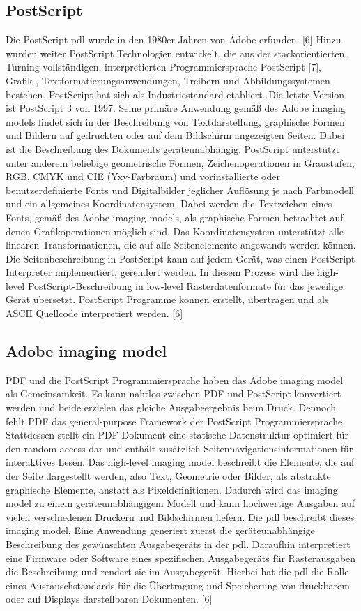 \subsection{PostScript}
Die PostScript \gls{pdl} wurde in den 1980er Jahren von Adobe erfunden. [6] Hinzu wurden weiter PostScript Technologien entwickelt, die aus der stackorientierten, Turning-vollständigen, interpretierten Programmiersprache PostScript [7], Grafik-, Textformatierungsanwendungen, Treibern und Abbildungssystemen bestehen. PostScript hat sich als Industriestandard etabliert. Die letzte Version ist PostScript 3 von 1997. Seine primäre Anwendung gemäß des Adobe imaging models findet sich in der Beschreibung von Textdarstellung, graphische Formen und Bildern auf gedruckten oder auf dem Bildschirm angezeigten Seiten. Dabei ist die Beschreibung des Dokuments geräteunabhängig. PostScript unterstützt unter anderem beliebige geometrische Formen, Zeichenoperationen in Graustufen, RGB, CMYK und CIE (Yxy-Farbraum) und  vorinstallierte oder benutzerdefinierte Fonts und Digitalbilder jeglicher Auflösung je nach Farbmodell und ein allgemeines Koordinatensystem.
Dabei werden die Textzeichen eines Fonts, gemäß des Adobe imaging models, als graphische Formen betrachtet auf denen Grafikoperationen möglich sind. Das Koordinatensystem unterstützt alle linearen Transformationen, die auf alle Seitenelemente angewandt werden können. Die Seitenbeschreibung in PostScript kann auf jedem Gerät, was einen PostScript Interpreter implementiert, gerendert werden. In diesem Prozess wird die high-level PostScript-Beschreibung in low-level Rasterdatenformate für das jeweilige Gerät übersetzt. PostScript Programme können erstellt, übertragen und als ASCII Quellcode interpretiert werden. [6]

\subsection{Adobe imaging model}
PDF und die PostScript Programmiersprache haben das Adobe imaging model als Gemeinsamkeit. Es kann nahtlos zwischen PDF und PostScript konvertiert werden und beide erzielen das gleiche Ausgabeergebnis beim Druck. Dennoch fehlt PDF das general-purpose Framework der PostScript Programmiersprache. Stattdessen stellt ein PDF Dokument eine statische Datenstruktur optimiert für den random access dar und enthält zusätzlich Seitennavigationsinformationen für interaktives Lesen. Das high-level imaging model beschreibt die Elemente, die auf der Seite dargestellt werden, also Text, Geometrie oder Bilder, als abstrakte graphische Elemente, anstatt als Pixeldefinitionen. Dadurch wird das imaging model zu einem geräteunabhängigem Modell und kann hochwertige Ausgaben auf vielen verschiedenen Druckern und Bildschirmen liefern. Die \gls{pdl} beschreibt dieses imaging model. Eine Anwendung generiert zuerst die geräteunabhängige Beschreibung des gewünschten Ausgabegeräts in der \gls{pdl}. Daraufhin interpretiert eine Firmware oder Software eines spezifischen Ausgabegeräts für Rasterausgaben die Beschreibung und rendert sie im Ausgabegerät. Hierbei hat die \gls{pdl} die Rolle eines Austauschstandards für die Übertragung und Speicherung von druckbarem oder auf Displays darstellbaren Dokumenten. [6]

